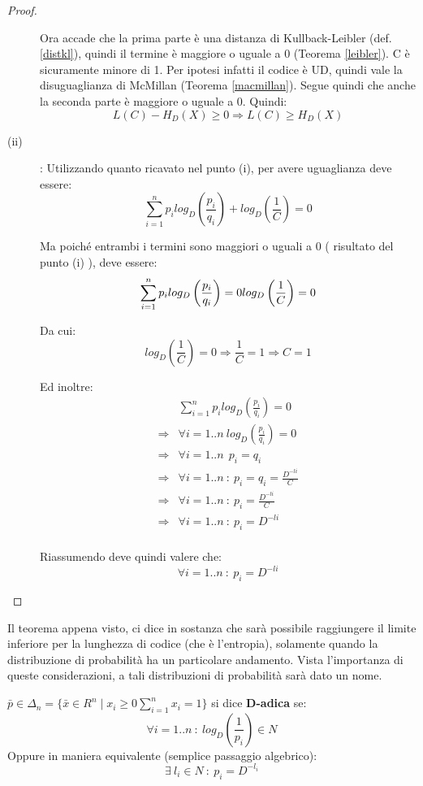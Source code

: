 \begin{teorema}
\begin{proof}
\begin{description}
Ora accade che la prima parte è una distanza di Kullback-Leibler (def. \ref{distkl}), quindi il termine è maggiore o uguale a 0 (Teorema \ref{leibler}).
C è sicuramente minore di 1. Per ipotesi infatti il codice è UD, quindi vale la disuguaglianza di McMillan (Teorema \ref{macmillan}).
Segue quindi che anche la seconda parte è maggiore o uguale a 0.
Quindi:
\[
 L(C) - H_D(X) \ge 0 \Rightarrow L(C) \ge H_D(X)
\]
\item[(ii)]: 
Utilizzando quanto ricavato nel punto (i), per avere uguaglianza deve essere:
\[
 \sum_{i=1}^n p_i log_D \left( \frac{p_i}{q_i} \right) + log_D \left( \frac{1}{C} \right)=0
\]

Ma poiché entrambi i termini sono maggiori o uguali a 0 ( risultato del punto (i) ), deve essere:
\[
 \sum_{i=1}^n p_i log_D \left( \frac{p_i}{q_i} \right)=0 \\ log_D \left( \frac{1}{C} \right)=0
\]

Da cui:
\[
 log_D \left( \frac{1}{C} \right)=0 \Rightarrow \frac{1}{C}=1 \Rightarrow C=1
\]

Ed inoltre:
\[\begin{split}
  & \sum_{i=1}^n p_i log_D \left( \frac{p_i}{q_i} \right)=0 \\
  \Rightarrow & \forall i=1..n \ log_D \left( \frac{p_i}{q_i} \right)=0 \\
  \Rightarrow & \forall i=1..n \: \ p_i=q_i \\
  \Rightarrow & \forall i=1..n \ : \ p_i=q_i=\frac{D^{-li}}{C} \\
  \Rightarrow & \forall i=1..n \ : \ p_i=\frac{D^{-li}}{C} \\
  \Rightarrow & \forall i=1..n \ : \ p_i=D^{-li} \\
  \end{split}
\]

Riassumendo deve quindi valere che:
\[
 \forall i=1..n \ : \ p_i=D^{-li}
\]

\end{description}
\end{proof}
\end{teorema}

Il teorema appena visto, ci dice in sostanza che sarà possibile raggiungere il limite inferiore per la lunghezza di codice (che è l'entropia), solamente quando la distribuzione di probabilità ha un particolare andamento.
Vista l'importanza di queste considerazioni, a tali distribuzioni di probabilità sarà dato un nome.

\begin{definizione}
 $\bar{p} \in \Delta_n=\{\bar{x} \in R^n \mid x_i \ge 0 \sum_{i=1}^n x_i=1\}$ si dice \textbf{D-adica} se:
\[
 \forall i=1..n \ : \ log_D \left ( \frac{1}{p_i} \right ) \in N
\]
Oppure in maniera equivalente (semplice passaggio algebrico):
\[
 \exists \ l_i \in N \ : \ p_i=D^{-l_i}
\]


\end{definizione}


